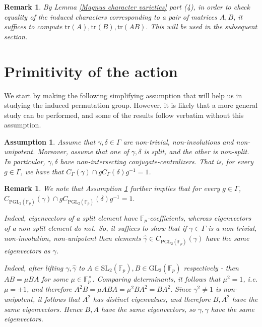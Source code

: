\documentclass[letterpaper]{amsart}
\newtheorem{remark}[theorem]{Remark}
\newtheorem{assumption}[theorem]{Assumption}
\begin{document}
\begin{remark}
\label{Character variety F2}
    By Lemma \ref{Magnus character varieties} part (4), in order to check equality of the induced characters corresponding to a pair of matrices $A, B$, it suffices to compute $\mathrm{tr}(A), \mathrm{tr}(B), \mathrm{tr}(AB).$ This will be used in the subsequent section.
\end{remark}
\section{Primitivity of the action}
We start by making the following simplifying assumption that will help us in studying the induced permutation group. However, it is likely that a more general study can be performed, and some of the results follow verbatim without this assumption.
\begin{assumption}
\label{Assumption on non-conjugation}
    Assume that $\gamma,\delta \in \Gamma$ are non-trivial, non-involutions and non-unipotent. Moreover, assume that one of $\gamma,\delta$ is split, and the other is non-split.
    In particular, $\gamma,\delta$ have non-intersecting conjugate-centralizers. That is, for every $g\in \Gamma$, we have that $C_\Gamma(\gamma)\cap gC_\Gamma(\delta)g^{-1} = 1$.
\end{assumption}
\begin{remark}
\label{PGL2-non-conjugation}
    We note that Assumption \ref{Assumption on non-conjugation} further implies that for every $g \in \Gamma$, $C_{\mathrm{PGL}_2(\mathbb{F}_p)}(\gamma) \cap gC_{\mathrm{PGL}_2(\mathbb{F}_p)}(\delta)g^{-1} = 1.$

    Indeed, eigenvectors of a split element have $\mathbb{F}_p$-coefficients, whereas eigenvectors of a non-split element do not. So, it suffices to show that if $\gamma \in \Gamma$ is a non-trivial, non-involution, non-unipotent then elements $\hat{\gamma} \in C_{\mathrm{PGL}_2(\mathbb{F}_p)}(\gamma)$ have the same eigenvectors as $\gamma$.
    
    Indeed, after lifting $\gamma, \hat{\gamma}$ to $A \in \mathrm{SL}_2(\mathbb{F}_p), B \in \mathrm{GL}_2(\mathbb{F}_p)$ respectively - then $AB = \mu BA$ for some $\mu \in \mathbb{F}_p^\times$. Comparing determinants, it follows that $\mu^2 = 1$, i.e. $\mu = \pm 1$, and therefore $A^2B = \mu ABA = \mu^2 BA^2 = BA^2.$ Since $\gamma^2 \neq 1$ is non-unipotent, it follows that $A^2$ has distinct eigenvalues, and therefore $B, A^2$ have the same eigenvectors. Hence $B, A$ have the same eigenvectors, so $\gamma, \hat{\gamma}$ have the same eigenvectors.
\end{remark}
\end{document}
